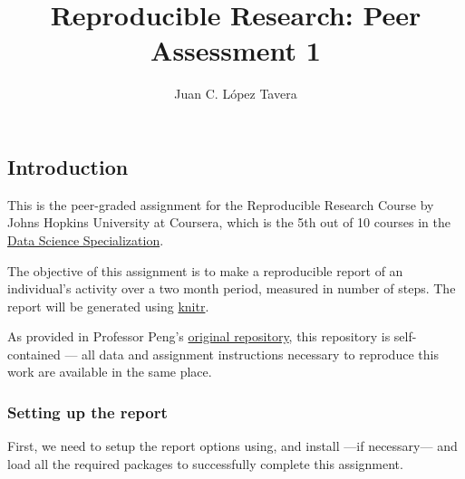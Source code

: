\documentclass[]{article}
\title{Reproducible Research: Peer Assessment 1}
\author{Juan C. López Tavera}
\date{}
\begin{document}
\maketitle

\subsection{Introduction}\label{introduction}

This is the peer-graded assignment for the Reproducible Research Course
by Johns Hopkins University at Coursera, which is the 5th out of 10
courses in the
\href{https://www.coursera.org/specializations/jhu-data-science}{Data
Science Specialization}.

The objective of this assignment is to make a reproducible report of an
individual's activity over a two month period, measured in number of
steps. The report will be generated using
\href{https://yihui.name/knitr/}{knitr}.

As provided in Professor Peng's
\href{https://github.com/rdpeng/RepData_PeerAssessment1}{original
repository}, this repository is self-contained --- all data and
assignment instructions necessary to reproduce this work are available
in the same place.

\subsubsection{Setting up the report}\label{setting-up-the-report}

First, we need to setup the report options using, and install ---if
necessary--- and load all the required packages to successfully complete
this assignment.
\end{document}
